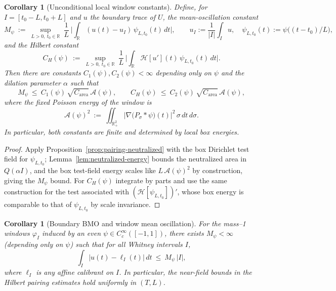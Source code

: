 \documentclass[11pt]{article}
\newtheorem{corollary}[theorem]{Corollary}
\theoremstyle{definition}
\theoremstyle{remark}
\newcommand{\R}{\mathbb{R}}
\begin{document}
\begin{corollary}[Unconditional local window constants]\label{cor:CH-Mpsi-final}
Define, for $I=[t_0-L,t_0+L]$ and $u$ the boundary trace of $U$, the mean-oscillation constant
\[
  M_\psi\ :=\ \sup_{L>0,\ t_0\in\R}\ \frac{1}{L}\,\Big|\int_{\R} (u(t)-u_I)\,\psi_{L,t_0}(t)\,dt\Big|,\qquad u_I:=\frac{1}{|I|}\int_I u,\quad \psi_{L,t_0}(t):=\psi\big((t-t_0)/L\big),
\]
and the Hilbert constant
\[
  C_H(\psi)\ :=\ \sup_{L>0,\ t_0\in\R}\ \frac{1}{L}\,\Big|\int_{\R} \mathcal H[u'](t)\,\psi_{L,t_0}(t)\,dt\Big|.
\]
Then there are constants $C_1(\psi),C_2(\psi)<\infty$ depending only on $\psi$ and the dilation parameter $\alpha$ such that
\[
  M_\psi\ \le\ C_1(\psi)\,\sqrt{C_{\mathrm{area}}}\,\mathcal A(\psi),\qquad
  C_H(\psi)\ \le\ C_2(\psi)\,\sqrt{C_{\mathrm{area}}}\,\mathcal A(\psi),
\]
where the fixed Poisson energy of the window is
\[
  \mathcal A(\psi)^2\ :=\ \iint_{\R^2_+}\!\big|\nabla\big(P_\sigma*\psi\big)(t)\big|^2\,\sigma\,dt\,d\sigma.
\]
In particular, both constants are finite and determined by local box energies.
\end{corollary}

\begin{proof}
Apply Proposition~\ref{prop:pairing-neutralized} with the box Dirichlet test field for $\psi_{L,t_0}$; Lemma~\ref{lem:neutralized-energy} bounds the neutralized area in $Q(\alpha I)$, and the box test-field energy scales like $L\,\mathcal A(\psi)^2$ by construction, giving the $M_\psi$ bound. For $C_H(\psi)$ integrate by parts and use the same construction for the test associated with $(\mathcal H[\psi_{L,t_0}])'$, whose box energy is comparable to that of $\psi_{L,t_0}$ by scale invariance.
\end{proof}

\begin{corollary}[Boundary BMO and window mean oscillation]\label{cor:bmo-boundary}
For the mass--1 windows $\varphi_I$ induced by an even $\psi\in C_c^\infty([-1,1])$, there exists $M_\psi<\infty$ (depending only on $\psi$) such that for all Whitney intervals $I$,
\[ \int_I |u(t)-\ell_I(t)|\,dt\ \le\ M_\psi\,|I|, \]
where $\ell_I$ is any affine calibrant on $I$. In particular, the near-field bounds in the Hilbert pairing estimates hold uniformly in $(T,L)$.
\end{corollary}
\end{document}
